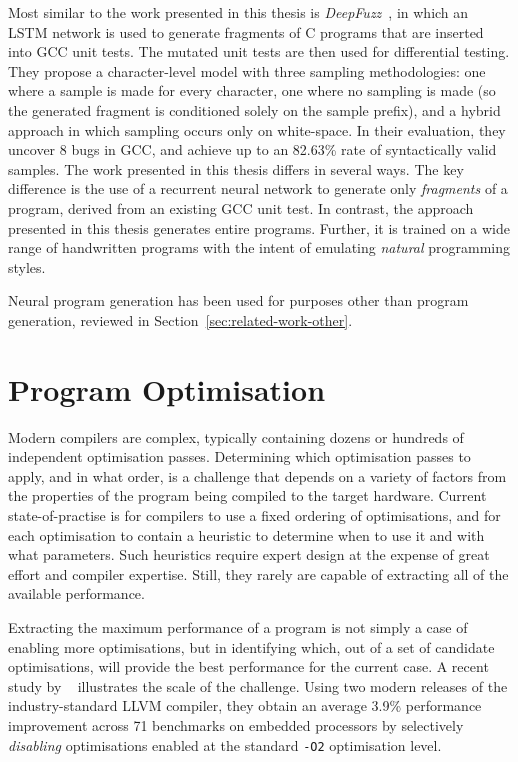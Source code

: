 Most similar to the work presented in this thesis is \emph{DeepFuzz}~\cite{Liu2019}, in which an LSTM network is used to generate fragments of C programs that are inserted into GCC unit tests. The mutated unit tests are then used for differential testing. They propose a character-level model with three sampling methodologies: one where a sample is made for every character, one where no sampling is made (so the generated fragment is conditioned solely on the sample prefix), and a hybrid approach in which sampling occurs only on white-space. In their evaluation, they uncover 8 bugs in GCC, and achieve up to an 82.63\% rate of syntactically valid samples. The work presented in this thesis differs in several ways. The key difference is the use of a recurrent neural network to generate only \emph{fragments} of a program, derived from an existing GCC unit test. In contrast, the approach presented in this thesis generates entire programs. Further, it is trained on a wide range of handwritten programs with the intent of emulating \emph{natural} programming styles.

Neural program generation has been used for purposes other than program generation, reviewed in Section~\ref{sec:related-work-other}.


\section{Program Optimisation}
\label{sec:related-work-optimisation}

Modern compilers are complex, typically containing dozens or hundreds of independent optimisation passes. Determining which optimisation passes to apply, and in what order, is a challenge that depends on a variety of factors from the properties of the program being compiled to the target hardware. Current state-of-practise is for compilers to use a fixed ordering of optimisations, and for each optimisation to contain a heuristic to determine when to use it and with what parameters. Such heuristics require expert design at the expense of great effort and compiler expertise. Still, they rarely are capable of extracting all of the available performance.

Extracting the maximum performance of a program is not simply a case of enabling more optimisations, but in identifying which, out of a set of candidate optimisations, will provide the best performance for the current case. A recent study by \citeauthor{Georgiou2018}~\cite{Georgiou2018} illustrates the scale of the challenge. Using two modern releases of the industry-standard LLVM compiler, they obtain an average 3.9\% performance improvement across 71 benchmarks on embedded processors by selectively \emph{disabling} optimisations enabled at the standard \texttt{-O2} optimisation level.

